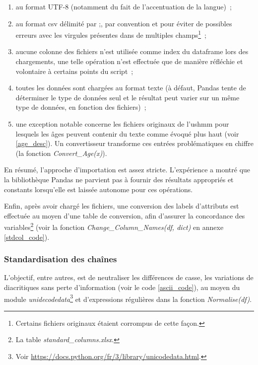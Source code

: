 \documentclass[a4paper,12pt,twoside]{book}
\begin{document}
	                \begin{enumerate}
	                    \item au format UTF-8 (notamment du fait de l'accentuation de la langue)~;
	                    \item au format \acrshort{csv} délimité par \og{};\fg{}, par convention et pour éviter de possibles erreurs avec les virgules présentes dans de multiples champs\footnote{Certains fichiers originaux étaient corrompus de cette façon.}~;
	                    \item aucune colonne des fichiers n'est utilisée comme index du dataframe lors des chargements, une telle opération n'est effectuée que de manière réfléchie et volontaire à certains points du script~;
	                    \item toutes les données sont chargées au format texte (à défaut, Pandas tente de déterminer le type de données seul et le résultat peut varier sur un même type de données, en fonction des fichiers)~;
	                    \item une exception notable concerne les fichiers originaux de l'\gls{ushmm} pour lesquels les âges peuvent contenir du texte comme évoqué plus haut (voir \ref{age_desc}). Un convertisseur transforme ces entrées problématiques en chiffre (la fonction \textit{Convert\_Age(x)}).
	               \end{enumerate}
	            
	                En résumé, l'approche d'importation est assez stricte. L'expérience a montré que la bibliothèque Pandas ne parvient pas à fournir des résultats appropriés et constants lorsqu'elle est laissée autonome pour ces opérations.
	            
	                \label{stdcol}Enfin, après avoir chargé les fichiers, une conversion  des labels d'attributs est effectuée au moyen d'une table de conversion, afin d'assurer la concordance des variables\footnote{La table \textit{standard\_columns.xlsx}.} (voir la fonction \textit{Change\_Column\_Names(df, dict)} en annexe \ref{stdcol_code}).
	                
	            \subsubsection{Standardisation des chaînes}
	            \label{ascii}
	                
	                L'objectif, entre autres, est de neutraliser les différences de casse, les variations de diacritiques sans perte d'information (voir le code \ref{ascii_code}), au moyen du module \textit{unidecodedata}\footnote{Voir \url{https://docs.python.org/fr/3/library/unicodedata.html}.} et d'expressions régulières dans la fonction \textit{Normalise(df)}.
	                \pagebreak
	                
\end{document}
